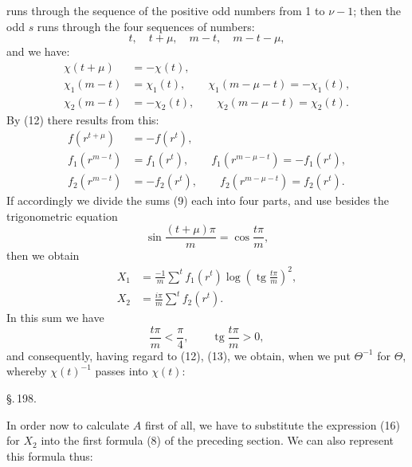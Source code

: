 
runs through the sequence of the positive odd numbers from 1 to $\nu - 1$;
then the odd $s$ runs through the four sequences of numbers:
\[
t, \quad t+\mu, \quad m-t, \quad m-t-\mu,
\]
and we have:
\[
\begin{aligned}
\chi(t+\mu) &= -\chi(t), \\
\chi_1(m-t) &= \chi_1(t), \qquad \chi_1(m-\mu-t) = -\chi_1(t), \\
\chi_2(m-t) &= -\chi_2(t), \qquad \chi_2(m-\mu-t) = \chi_2(t).
\end{aligned}
\]
By (12) there results from this:
\[
\begin{aligned}
f(r^{t+\mu}) &= -f(r^t), \\
f_1(r^{m-t}) &= f_1(r^t), \qquad f_1(r^{m-\mu-t}) = -f_1(r^t), \\
f_2(r^{m-t}) &= -f_2(r^t), \qquad f_2(r^{m-\mu-t}) = f_2(r^t).
\end{aligned}
\]
If accordingly we divide the sums (9) each into four parts, and use
besides the trigonometric equation
\[
\sin \frac{(t+\mu)\pi}{m} = \cos \frac{t\pi}{m},
\]
then we obtain
\[
\begin{aligned}
X_1 &= \frac{-1}{m} \sum^{t} f_1(r^t)
\log\left(\operatorname{tg} \frac{t\pi}{m}\right)^2, \\
X_2 &= \frac{i\pi}{m} \sum^{t} f_2(r^t).
\end{aligned}
\]
In this sum we have
\[
\frac{t\pi}{m} < \frac{\pi}{4}, \qquad
\operatorname{tg} \frac{t\pi}{m} > 0,
\]
and consequently, having regard to (12), (13), we obtain, when we put
$\Theta^{-1}$ for $\Theta$, whereby $\chi(t)^{-1}$ passes into
$\chi(t)$:

\begin{center}
\S.\,198.

\end{center}

In order now to calculate $A$ first of all, we have to substitute the
expression (16) for $X_2$ into the first formula (8) of the preceding
section. We can also represent this formula thus:

